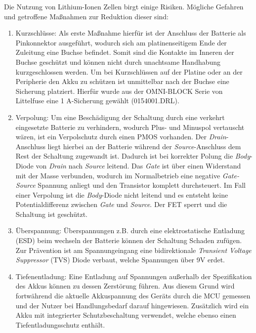 Die Nutzung von Lithium-Ionen Zellen birgt einige Risiken. Mögliche Gefahren und getroffene Maßnahmen zur Reduktion dieser sind:

\begin{enumerate}
	\item Kurzschlüsse:	Als erste Maßnahme hierfür ist der Anschluss der Batterie als Pinkonnektor ausgeführt, wodurch sich am platinenseitigem Ende der Zuleitung eine Buchse befindet. Somit sind die Kontakte im Inneren der Buchse geschützt und können nicht durch unachtsame Handhabung kurzgeschlossen werden. Um bei Kurzschlüssen auf der Platine oder an der Peripherie den Akku zu schützen ist unmittelbar nach der Buchse eine Sicherung platziert. Hierfür wurde aus der OMNI-BLOCK Serie von Littelfuse eine 1 A-Sicherung gewählt (0154001.DRL). 
	
	\item Verpolung: Um eine Beschädigung der Schaltung durch eine verkehrt eingesetzte Batterie zu verhindern, wodurch Plus- und Minuspol vertauscht wären, ist ein Verpolschutz durch einen PMOS vorhanden. Der \textit{Drain}-Anschluss liegt hierbei an der Batterie während der \textit{Source}-Anschluss dem Rest der Schaltung zugewandt ist. Dadurch ist bei korrekter Polung die \textit{Body}-Diode von \textit{Drain} nach \textit{Source} leitend. Das \textit{Gate} ist über einen Widerstand mit der Masse verbunden, wodurch im Normalbetrieb eine negative \textit{Gate-Source} Spannung anliegt und den Transistor komplett durchsteuert. Im Fall einer Verpolung ist die \textit{Body}-Diode nicht leitend und es entsteht keine Potentialdifferenz zwischen \textit{Gate} und \textit{Source}. Der FET sperrt und die Schaltung ist geschützt.

	\item Überspannung:	Überspannungen z.B. durch eine elektrostatische Entladung (ESD) beim wechseln der Batterie können der Schaltung Schaden zufügen. Zur Prävention ist am Spannungeingang eine bidirektionale \textit{Transient Voltage Suppressor} (TVS) Diode verbaut, welche Spannungen über 9V erdet.
	
	\item Tiefenentladung: Eine Entladung auf Spannungen außerhalb der Spezifikation des Akkus können zu dessen Zerstörung führen. Aus diesem Grund wird fortwährend die aktuelle Akkuspannung des Geräts durch die MCU gemessen und der Nutzer bei Handlungsbedarf darauf hingewiesen. Zusätzlich wird ein Akku mit integrierter Schutzbeschaltung verwendet, welche ebenso einen Tiefentladungsschutz enthält.
\end{enumerate}

